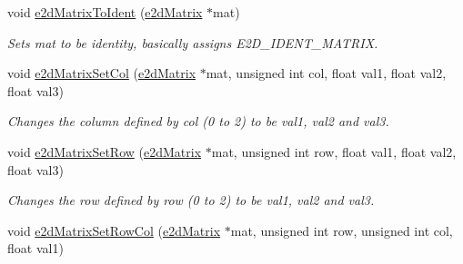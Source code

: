 \begin{DoxyCompactItemize}
\item 
\hypertarget{group__Ez2DS_gae071d0d13c408d0faa8ea81731a47746}{void \hyperlink{group__Ez2DS_gae071d0d13c408d0faa8ea81731a47746}{e2d\-Matrix\-To\-Ident} (\hyperlink{structe2dMatrix}{e2d\-Matrix} $\ast$mat)}\label{group__Ez2DS_gae071d0d13c408d0faa8ea81731a47746}

\begin{DoxyCompactList}\small\item\em Sets mat to be identity, basically assigns E2\-D\-\_\-\-I\-D\-E\-N\-T\-\_\-\-M\-A\-T\-R\-I\-X. \end{DoxyCompactList}\item 
\hypertarget{group__Ez2DS_gab5e5b40fd56f6fde5ec19e09733ddb35}{void \hyperlink{group__Ez2DS_gab5e5b40fd56f6fde5ec19e09733ddb35}{e2d\-Matrix\-Set\-Col} (\hyperlink{structe2dMatrix}{e2d\-Matrix} $\ast$mat, unsigned int col, float val1, float val2, float val3)}\label{group__Ez2DS_gab5e5b40fd56f6fde5ec19e09733ddb35}

\begin{DoxyCompactList}\small\item\em Changes the column defined by col (0 to 2) to be val1, val2 and val3. \end{DoxyCompactList}\item 
\hypertarget{group__Ez2DS_gaca877ffd79967e78914eb5fea731300b}{void \hyperlink{group__Ez2DS_gaca877ffd79967e78914eb5fea731300b}{e2d\-Matrix\-Set\-Row} (\hyperlink{structe2dMatrix}{e2d\-Matrix} $\ast$mat, unsigned int row, float val1, float val2, float val3)}\label{group__Ez2DS_gaca877ffd79967e78914eb5fea731300b}

\begin{DoxyCompactList}\small\item\em Changes the row defined by row (0 to 2) to be val1, val2 and val3. \end{DoxyCompactList}\item 
\hypertarget{group__Ez2DS_ga5719742adf7b07c791323de17be257a9}{void \hyperlink{group__Ez2DS_ga5719742adf7b07c791323de17be257a9}{e2d\-Matrix\-Set\-Row\-Col} (\hyperlink{structe2dMatrix}{e2d\-Matrix} $\ast$mat, unsigned int row, unsigned int col, float val1)}\label{group__Ez2DS_ga5719742adf7b07c791323de17be257a9}


\end{DoxyCompactItemize}

